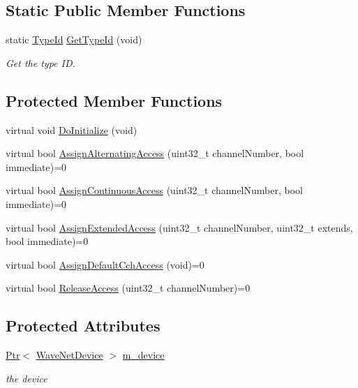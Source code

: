 \subsection*{Static Public Member Functions}
\begin{DoxyCompactItemize}
\item 
static \hyperlink{classns3_1_1TypeId}{Type\+Id} \hyperlink{classns3_1_1ChannelScheduler_a27c8aa9abefb8be397f83477e1b78b4d}{Get\+Type\+Id} (void)
\begin{DoxyCompactList}\small\item\em Get the type ID. \end{DoxyCompactList}\end{DoxyCompactItemize}
\subsection*{Protected Member Functions}
\begin{DoxyCompactItemize}
\item 
virtual void \hyperlink{classns3_1_1ChannelScheduler_a1f2861fccda9236e6d129b5a2b0db675}{Do\+Initialize} (void)
\item 
virtual bool \hyperlink{classns3_1_1ChannelScheduler_af0271355fea052d70ea7f294815665e3}{Assign\+Alternating\+Access} (uint32\+\_\+t channel\+Number, bool immediate)=0
\item 
virtual bool \hyperlink{classns3_1_1ChannelScheduler_add316fb72a43d2ee22a55fef0c341a41}{Assign\+Continuous\+Access} (uint32\+\_\+t channel\+Number, bool immediate)=0
\item 
virtual bool \hyperlink{classns3_1_1ChannelScheduler_ae34d7ccddc8be5578dd6df92f95394d2}{Assign\+Extended\+Access} (uint32\+\_\+t channel\+Number, uint32\+\_\+t extends, bool immediate)=0
\item 
virtual bool \hyperlink{classns3_1_1ChannelScheduler_a9259512c27abac5635dd9c86efc7945c}{Assign\+Default\+Cch\+Access} (void)=0
\item 
virtual bool \hyperlink{classns3_1_1ChannelScheduler_acf0f97227d2908378394504bc8f615e9}{Release\+Access} (uint32\+\_\+t channel\+Number)=0
\end{DoxyCompactItemize}
\subsection*{Protected Attributes}
\begin{DoxyCompactItemize}
\item 
\hyperlink{classns3_1_1Ptr}{Ptr}$<$ \hyperlink{classns3_1_1WaveNetDevice}{Wave\+Net\+Device} $>$ \hyperlink{classns3_1_1ChannelScheduler_ac3d6c3071b8c796afb73789844968405}{m\+\_\+device}
\begin{DoxyCompactList}\small\item\em the device \end{DoxyCompactList}\end{DoxyCompactItemize}
